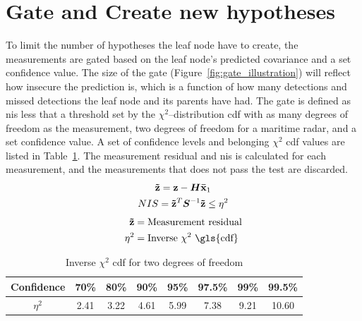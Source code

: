 \section{Gate and Create new hypotheses}
To limit the number of hypotheses the leaf node have to create, the measurements are gated based on the leaf node's predicted covariance and a set confidence value. The size of the gate (Figure~\ref{fig:gate_illustration}) will reflect how insecure the prediction is, which is a function of how many detections and missed detections the leaf node and its parents have had. The gate is defined as \gls{nis} less that a threshold set by the \(\chi^2\)--distribution \gls{cdf} with as many degrees of freedom as the measurement, two degrees of freedom for a maritime radar, and a set confidence value. A set of confidence levels and belonging \(\chi^2\) \gls{cdf} values are listed in Table~\ref{tab:chi_square}. The measurement residual and \gls{nis} is calculated for each measurement, and the measurements that does not pass the test are discarded.
\begin{equation}\label{eq:gate}
\begin{gathered}
\boldsymbol{\mathbf{\tilde{z}}} = \boldsymbol{\mathbf{z}} - \bm{H}\boldsymbol{\mathbf{\bar{x}}}_1 \\
NIS = \boldsymbol{\mathbf{\tilde{z}}}^T	\bm{S}^{-1} \boldsymbol{\mathbf{\tilde{z}}} \leq \eta^2
\end{gathered}
\end{equation}
\begin{equation*}
\begin{split}
\V{\tilde{z}}	&= \text{Measurement residual}  \\
\eta^2 			&= \text{Inverse \(\chi^2\) \gls{cdf}} \\
\end{split}
\end{equation*}
\begin{table}
\centering
\begin{tabular}{c c c c c c c c}
Confidence 	& 70\% 	& 80\% 	& 90\% 	& 95\% 	& 97.5\% 	& 99\% 	& 99.5\% \\ 
\midrule
\(\eta^2\) 	& 2.41 	& 3.22 	& 4.61 	& 5.99 	& 7.38 		& 9.21 	& 10.60
\end{tabular}\caption{Inverse \(\chi^2\) \gls{cdf} for two degrees of freedom}
~\label{tab:chi_square}
\end{table}
